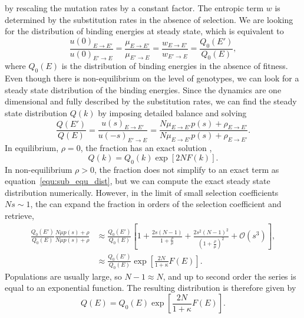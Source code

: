 \documentclass[10pt,a4paper]{article}
\begin{document}
by rescaling the mutation rates by a constant factor. The entropic term $w$ is determined by the substitution rates in the absence of selection.
We are looking for the distribution of binding energies at steady state, which is equivalent to 
\begin{equation}
\frac{u(0)_{E\rightarrow E'}}{u(0)_{E'\rightarrow E}} = \frac{\mu_{E\rightarrow E'}}{\mu_{E'\rightarrow E}}= \frac{w_{E\rightarrow E'}}{w_{E'\rightarrow E}} = 
\frac{Q_0(E')}{Q_0(E)},
\end{equation}
where $Q_0(E)$ is the distribution of binding energies in the absence of fitness. Even though there is non-equilibrium on the level of genotypes, 
we can look for a steady state distribution of the binding energies. Since the dynamics are one dimensional and fully described by the substitution rates, 
we can find the steady state distribution $Q(k)$ by imposing detailed balance and solving
\begin{equation}
\frac{Q(E')}{Q(E)}=\frac{u(s)_{E\rightarrow E'}}{u(-s)_{E'\rightarrow E}}=  \frac{ N\mu_{E\rightarrow E'}p(s)+\rho_{E\rightarrow E'}}{N\mu_{E\rightarrow E'}p(s)
+\rho_{E\rightarrow E'}}.
\end{equation}
In equilibrium, $\rho=0$, the fraction has an exact solution \cite{berg_adaptive_2004},
\begin{equation}
	Q(k) = Q_0(k)\exp[2NF(k)].
	\label{equ:sub_equ_dist}
\end{equation}
In non-equilibrium $\rho>0$, the fraction does not simplify to an exact term as equation~\ref{equ:sub_equ_dist}, but we can compute the exact steady state 
distribution numerically. However, in the limit of small selection coefficients $Ns\sim1$, the can expand the fraction in orders of the selection coefficient 
and retrieve,
\begin{align}
\frac{Q_0(E')}{Q_0(E)}\frac{ N\mu p(s)+\rho}{N\mu p(s)+\rho}&\approx \frac{Q_0(E')}{Q_0(E)}\left[1+\frac{2s(N-1)}{1+\frac{\rho}{\mu}}+\frac{2s^2(N-1)^2}
{(1+\frac{\rho}{\mu})^2}+\mathcal{O}(s^3)\right] ,\nonumber\\
&\approx \frac{Q_0(E')}{Q_0(E)}\exp\left[\frac{2N}{1+\kappa}F(E)\right].
\end{align}
Populations are usually large, so $N-1\approx N$, and up to second order the series is equal to an exponential function. The resulting distribution is therefore 
given by
\begin{equation}
	Q(E) = Q_0(E) \exp\left[ \frac{2N}{1+\kappa} F(E) \right].
\end{equation}
\end{document}
